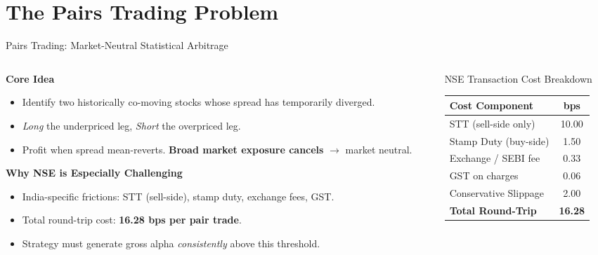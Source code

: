 \documentclass[aspectratio=169,10pt]{beamer}
\begin{document}
\section{The Pairs Trading Problem}

\begin{frame}{Pairs Trading: Market-Neutral Statistical Arbitrage}
  \begin{columns}[T]
    \begin{column}{0.56\textwidth}
      \textbf{Core Idea}
      \begin{itemize}\itemsep4pt
        \item Identify two historically co-moving stocks whose spread has temporarily diverged.
        \item \emph{Long} the underpriced leg, \emph{Short} the overpriced leg.
        \item Profit when spread mean-reverts. \textbf{Broad market exposure cancels} $\to$ market neutral.
      \end{itemize}
      \vspace{5pt}
      \textbf{Why NSE is Especially Challenging}
      \begin{itemize}\itemsep3pt
        \item India-specific frictions: STT (sell-side), stamp duty, exchange fees, GST.
        \item Total round-trip cost: \alert{\textbf{16.28 bps per pair trade}}.
        \item Strategy must generate gross alpha \emph{consistently} above this threshold.
      \end{itemize}
    \end{column}
    \begin{column}{0.41\textwidth}
      \begin{block}{NSE Transaction Cost Breakdown}
        \centering\scriptsize
        \renewcommand{\arraystretch}{1.3}
        \begin{tabular}{lc}
          \toprule
          \textbf{Cost Component} & \textbf{bps} \\
          \midrule
          STT (sell-side only)    & 10.00 \\
          Stamp Duty (buy-side)   & 1.50  \\
          Exchange / SEBI fee     & 0.33  \\
          GST on charges          & 0.06  \\
          Conservative Slippage   & 2.00  \\
          \midrule
          \textbf{Total Round-Trip} & \textbf{\alert{16.28}} \\
          \bottomrule
        \end{tabular}
      \end{block}
    \end{column}
  \end{columns}
\end{frame}
\end{document}
